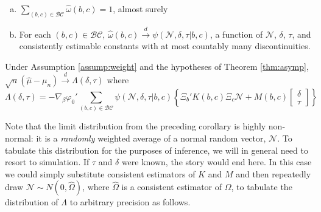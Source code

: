 \begin{assump}\mbox{}
	\begin{enumerate}[(a)] 
		\item $\sum_{(b,c) \in \mathcal{BC}} \widehat{\omega}(b,c) = 1$, almost surely
    \item For each $(b,c) \in \mathcal{BC}$, $\widehat{\omega}(b,c) \overset{d}{\rightarrow} \psi(\mathscr{N}, \delta, \tau|b,c)$,  a function of $\mathscr{N}$, $\delta$, $\tau$, and consistently estimable constants with at most countably many discontinuities.
	\end{enumerate}
\label{assump:weight}
\end{assump}

\begin{cor}
  Under Assumption \ref{assump:weight} and the hypotheses of Theorem \ref{thm:asymp},  
	$\sqrt{n}\left(\widehat{\mu} - \mu_n\right) \overset{d}{\rightarrow} \Lambda(\delta,\tau)$
where
	\begin{equation}
		\Lambda(\delta,\tau) = -\nabla_\beta\varphi_0' \sum_{(b,c) \in \mathcal{BC}} \psi(\mathscr{N},\delta, \tau|b,c) \left\{\Xi_b' K(b,c) \Xi_c \mathscr{N} + M(b,c)  \left[\begin{array}{c}\delta \\ \tau \end{array} \right]\right\}
	\end{equation}
  \label{cor:avg}
\end{cor}
Note that the limit distribution from the preceding corollary is highly non-normal: it is a \emph{randomly} weighted average of a normal random vector, $\mathscr{N}$.
To tabulate this distribution for the purposes of inference, we will in general need to resort to simulation.
If $\tau$ and $\delta$ were known, the story would end here.
In this case we could simply substitute consistent estimators of $K$ and $M$ and then repeatedly draw $\mathscr{N} \sim N(0, \widehat{\Omega})$, where $\widehat{\Omega}$ is a consistent estimator of $\Omega$, to tabulate the distribution of $\Lambda$ to arbitrary precision as follows.

